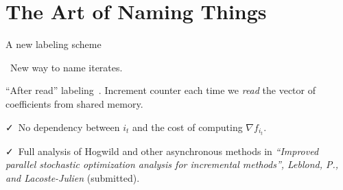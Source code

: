 \documentclass[10pt]{beamer}
\let\oldparencite=\parencite
\renewcommand{\parencite}[1]{\textcolor[rgb]{.7,.7,.7}{\oldparencite{#1}}}
\begin{document}
{
\section{The Art of {Naming \color{mDarkTeal} Things}}
}


\begin{frame}{A new labeling scheme}

{\Large\faLightbulbO}~New way to name iterates.

\pause
\vspace{1em}
``After read'' labeling~\parencite{leblond2016Asaga}. Increment counter each time we \emph{read} the vector of coefficients from shared memory.

\pause
\vspace{1em}
{\Large \faCheck}~No dependency between $i_t$ and the cost of computing $\nabla f_{i_t}$.

\vspace{1em}
{\Large \faCheck}~Full analysis of Hogwild and other asynchronous methods in \emph{``Improved parallel stochastic optimization analysis for
incremental methods'', Leblond, P., and Lacoste-Julien} (submitted).
\end{frame}
\end{document}
